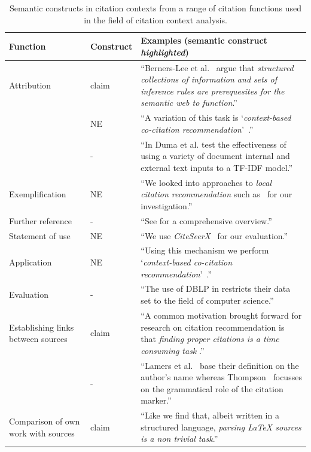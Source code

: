 \begin{table}[]
\centering
    \caption{Semantic constructs in citation contexts from a range of citation functions used in the field of citation context analysis.}
    \label{tab:citfunctions}
\begin{center}
    \begin{tabular}{m{2.7cm}lm{8.5cm}}
    \toprule
    Function & Construct & Examples (semantic construct \emph{highlighted})\\
    \midrule
    Attribution & claim & ``Berners-Lee et al.~\cite{Berners-Lee2001} argue that \emph{structured collections of information and sets of inference rules are prerequesites for the semantic web to function}.'' \\\noalign{\smallskip}
    \  & NE & ``A variation of this task is `\emph{context-based co-citation recommendation}'~\cite{Kobayashi2018}.'' \\\noalign{\smallskip}
    \  & - & ``In \cite{Duma2014} Duma et al. test the effectiveness of using a variety of document internal and external text inputs to a TF-IDF model.'' \\\noalign{\medskip}
    Exemplification & NE & ``We looked into approaches to \emph{local citation recommendation} such as~\cite{He2010,Huang2014,Huang2015,Duma2014,Duma2016,Ebesu2017,Kobayashi2018,Jeong2019} for our investigation.'' \\\noalign{\medskip}
    Further reference & - & ``See \cite{Niklaus2018} for a comprehensive overview.'' \\\noalign{\medskip}
    Statement of use & NE & ``We use \emph{CiteSeerX}~\cite{Caragea2014} for our evaluation.'' \\\noalign{\medskip}
    Application & NE & ``Using this mechanism we perform `\emph{context-based co-citation recommendation}'~\cite{Kobayashi2018}.'' \\\noalign{\medskip}
    Evaluation & - & ``The use of DBLP in \cite{Faerber2018} restricts their data set to the field of computer science.'' \\\noalign{\medskip}
    Establishing links between sources& claim & ``A common motivation brought forward for research on citation recommendation is that \emph{finding proper citations is a time consuming task} \cite{He2010,He2011,Ebesu2017,Kobayashi2018}.'' \\\noalign{\smallskip}
    \  & - & ``Lamers et al.~\cite{Lamers2018} base their definition on the author's name whereas Thompson~\cite{Thompson2001} focusses on the grammatical role of the citation marker.'' \\\noalign{\medskip}
    Comparison of own work with sources& claim & ``Like \cite{Faerber2018} we find that, albeit written in a structured language, \emph{parsing \LaTeX{} sources is a non trivial task}.'' \\
    \bottomrule
    \end{tabular}
\end{center}
\end{table}

